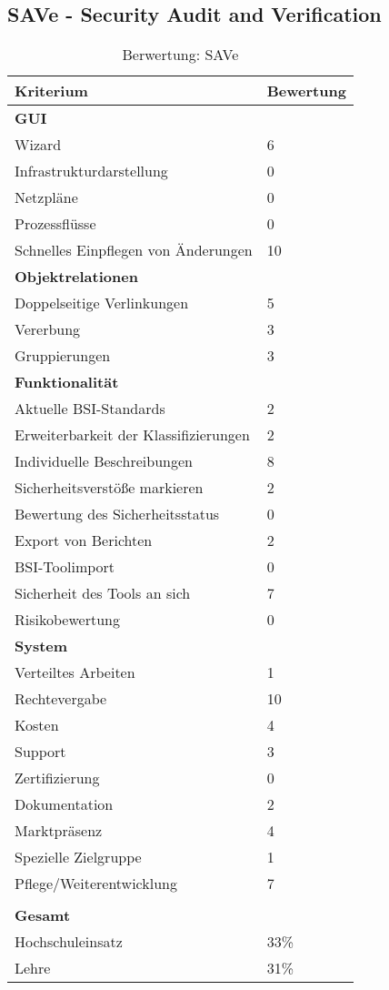 \subsection{SAVe - Security Audit and Verification}
\begin{table}[h!tb]
	\begin{tabular}{|p{}|p{}|}
		\hline 
		Kriterium & Bewertung\\ 
		\hline 
		\textbf{GUI}& \\
		\hline
		Wizard & 6\\
		\hline 
		Infrastrukturdarstellung & 0 \\
		\hline 
		Netzpläne & 0 \\
		\hline 
		Prozessflüsse & 0 \\
		\hline 
		Schnelles Einpflegen von Änderungen & 10 \\
		\hline
		\textbf{Objektrelationen} & \\
		\hline 
		Doppelseitige Verlinkungen & 5 \\
		\hline 
		Vererbung & 3 \\
		\hline 
		Gruppierungen & 3 \\
		\hline 
		\textbf{Funktionalität} &\\
		\hline 
		Aktuelle BSI-Standards & 2 \\
		\hline  
		Erweiterbarkeit der Klassifizierungen & 2 \\
		\hline 
		Individuelle Beschreibungen & 8 \\
		\hline 
		Sicherheitsverstöße markieren & 2 \\
		\hline
		Bewertung des Sicherheitsstatus & 0 \\
		\hline
		Export von Berichten & 2 \\
		\hline
		BSI-Toolimport & 0 \\
		\hline
		Sicherheit des Tools an sich & 7 \\
		\hline
		Risikobewertung & 0 \\
		\hline
		\textbf{System}&  \\
		\hline
		Verteiltes Arbeiten & 1 \\
		\hline
		Rechtevergabe & 10 \\
		\hline
		Kosten & 4 \\
		\hline
		Support & 3 \\
		\hline
		Zertifizierung & 0 \\
		\hline
		Dokumentation & 2 \\
		\hline
		Marktpräsenz & 4 \\
		\hline
		Spezielle Zielgruppe & 1 \\
		\hline
		Pflege/Weiterentwicklung & 7 \\
		\hline
		\multicolumn{2}{c}{}\\
		\hline
		\textbf{Gesamt} & \\
		\hline
		Hochschuleinsatz & 33\%\\
		\hline
		Lehre & 31\%\\
		\hline
	\end{tabular} 
	\caption{Berwertung: SAVe}
	\label{tab:BerwertungSave}
\end{table}
